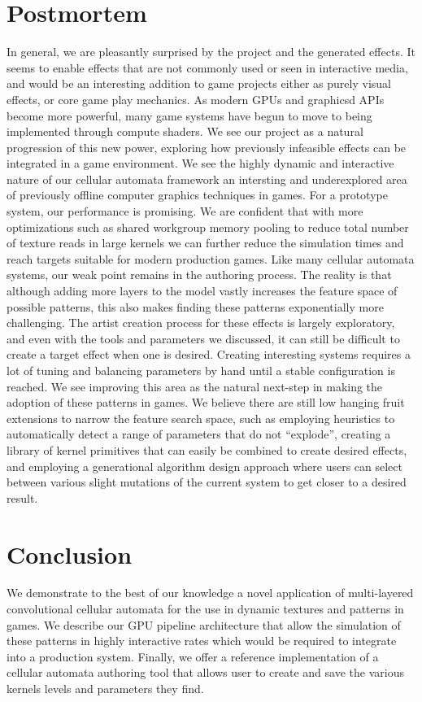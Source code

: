 \documentclass[twocolumn]{article}
\begin{document}
\section{Postmortem}
In general, we are pleasantly surprised by the project and the generated effects. It seems to enable effects that are not commonly used or seen in interactive media, and would be an interesting addition to game projects either as purely visual effects, or core game play mechanics. As modern GPUs and graphicsd APIs become more powerful, many game systems have begun to move to being implemented through compute shaders. We see our project as a natural progression of this new power, exploring how previously infeasible effects can be integrated in a game environment. We see the highly dynamic and interactive nature of our cellular automata framework an intersting and underexplored area of previously offline computer graphics techniques in games.
For a prototype system, our performance is promising. We are confident that with more optimizations such as shared workgroup memory pooling to reduce total number of texture reads in large kernels we can further reduce the simulation times and reach targets suitable for modern production games.
Like many cellular automata systems, our weak point remains in the authoring process. The reality is that although adding more layers to the model vastly increases the feature space of possible patterns, this also makes finding these patterns exponentially more challenging. The artist creation process for these effects is largely exploratory, and even with the tools and parameters we discussed, it can still be difficult to create a target effect when one is desired. Creating interesting systems requires a lot of tuning and balancing parameters by hand until a stable configuration is reached. We see improving this area as the natural next-step in making the adoption of these patterns in games. We believe there are still low hanging fruit extensions to narrow the feature search space, such as employing heuristics to automatically detect a range of parameters that do not ``explode'', creating a library of kernel primitives that can easily be combined to create desired effects, and employing a generational algorithm design approach where users can select between various slight mutations of the current system to get closer to a desired result.
\section{Conclusion}
We demonstrate to the best of our knowledge a novel application of multi-layered convolutional cellular automata for the use in dynamic textures and patterns in games. We describe our GPU pipeline architecture that allow the simulation of these patterns in highly interactive rates which would be required to integrate into a production system. Finally, we offer a reference implementation of a cellular automata authoring tool that allows user to create and save the various kernels levels and parameters they find. 

\pagebreak
\printbibliography
\end{document}
